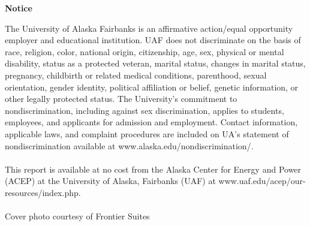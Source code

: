 \newpage
\noindent
{\centering
\bfseries\normalsize Notice
\par
}
\small The University of Alaska Fairbanks is an affirmative action/equal opportunity employer and educational institution. UAF does not discriminate on the basis of race, religion, color, national origin, citizenship, age, sex, physical or mental disability, status as a protected veteran, marital status, changes in marital status, pregnancy, childbirth or related medical conditions, parenthood, sexual orientation, gender identity, political affiliation or belief, genetic information, or other legally protected status. The University's commitment to nondiscrimination, including against sex discrimination, applies to students, employees, and applicants for admission and employment. Contact information, applicable laws, and complaint procedures are included on UA's statement of nondiscrimination available at www.alaska.edu/nondiscrimination/. \\
\\
\small This report is available at no cost from the Alaska Center for Energy and Power (ACEP) at the University of Alaska, Fairbanks (UAF) at www.uaf.edu/acep/our-resources/index.php. \\
\\
\small Cover photo courtesy of Frontier Suites